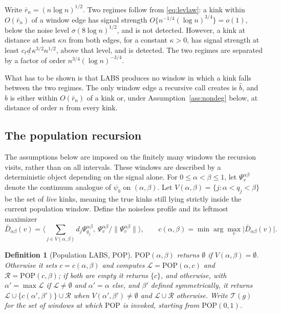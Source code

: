 \documentclass[12pt, a4paper]{article}
\newtheorem{defin}{Definition}[section]
\begin{document}
Write $\bar r_n = (n \log n)^{1/2}$. Two regimes follow from \eqref{eq:levlaw}: a kink within $O(\bar r_n)$ of a window edge has signal strength $O\{n^{-1/4}(\log n)^{3/4}\}=o(1)$, below the noise level $\sigma(8\log n)^{1/2}$, and is not detected. However, a kink at distance at least $\kappa n$ from both edges, for a constant $\kappa>0$, has signal strength at least $c_\ell\underline d\,\kappa^{3/2}n^{1/2}$, above that level, and is detected. The two regimes are separated by a factor of order $n^{3/4}(\log n)^{-3/4}$.

What has to be shown is that LABS produces no window in which a kink falls between the two regimes. The only window edge a recursive call creates is $\hat b$, and $\hat b$ is either within $O(\bar r_n)$ of a kink or, under Assumption~\ref{ass:nondeg} below, at distance of order $n$ from every kink.

\subsection{The population recursion}

The assumptions below are imposed on the finitely many windows the recursion visits, rather than on all intervals. These windows are described by a deterministic object depending on the signal alone. For $0\leq\alpha<\beta\leq1$, let $\Psi^{\alpha\beta}_v$ denote the continuum analogue of $\psi_b$ on $(\alpha,\beta)$. Let $V(\alpha,\beta)=\{j:\alpha<q_j<\beta\}$ be the set of \emph{live} kinks, meaning the true kinks still lying strictly inside the current population window. Define the noiseless profile and its leftmost maximizer
\begin{equation}
\label{eq:popprofile}
\bar D_{\alpha\beta}(v) = \Big\langle \sum_{j \in V(\alpha,\beta)} d_j \Psi^{\alpha\beta}_{q_j}, \ \Psi^{\alpha\beta}_v \big/ \|\Psi^{\alpha\beta}_v\| \Big\rangle, \qquad c(\alpha,\beta) = \min \arg\max_{v} \big| \bar D_{\alpha\beta}(v) \big| .
\end{equation}

\begin{defin}[Population LABS, POP]
\label{def:pop}
$\mathrm{POP}(\alpha,\beta)$ returns $\emptyset$ if $V(\alpha,\beta) = \emptyset$. Otherwise it sets $c = c(\alpha,\beta)$ and computes $\mathcal{L} = \mathrm{POP}(\alpha,c)$ and $\mathcal{R} = \mathrm{POP}(c,\beta)$; if both are empty it returns $\{c\}$, and otherwise, with $\alpha' = \max \mathcal{L}$ if $\mathcal{L} \neq \emptyset$ and $\alpha' = \alpha$ else, and $\beta'$ defined symmetrically, it returns $\mathcal{L} \cup \{ c(\alpha',\beta') \} \cup \mathcal{R}$ when $V(\alpha',\beta') \neq \emptyset$ and $\mathcal{L} \cup \mathcal{R}$ otherwise. Write $\mathcal{T}(g)$ for the set of windows at which $\mathrm{POP}$ is invoked, starting from $\mathrm{POP}(0,1)$.
\end{defin}
\end{document}

